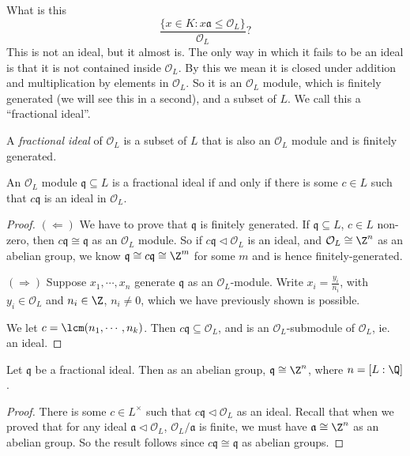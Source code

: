 \documentclass[a4paper]{article}
\begin{document}
What is this
\[
  \frac{\{x \in K: x \mathfrak{a} \leq \mathcal{O}_L\}}{\mathcal{O}_L}?
\]
This is not an ideal, but it almost is. The only way in which it fails to be an ideal is that it is not contained inside $\mathcal{O}_L$. By this we mean it is closed under addition and multiplication by elements in $\mathcal{O}_L$. So it is an $\mathcal{O}_L$ module, which is finitely generated (we will see this in a second), and a subset of $L$. We call this a ``fractional ideal''.

\begin{defi}
  A \emph{fractional ideal} of $\mathcal{O}_L$ is a subset of $L$ that is also an $\mathcal{O}_L$ module and is finitely generated.
\end{defi}

\begin{lemma}
  An $\mathcal{O}_L$ module $\mathfrak{q} \subseteq L$ is a fractional ideal if and only if there is some $c \in L$ such that $c\mathfrak{q}$ is an ideal in $\mathcal{O}_L$.
\end{lemma}

\begin{proof}
  $(\Leftarrow)$ We have to prove that $\mathfrak{q}$ is finitely generated. If $\mathfrak{q} \subseteq L$, $c \in L$ non-zero, then $c\mathfrak{q} \cong \mathfrak{q}$ as an $\mathcal{O}_L$ module. So if $c\mathfrak{q} \lhd \mathcal{O}_L$ is an ideal, and $\mathcal{O}_L \cong \Z^n$ as an abelian group, we know $\mathfrak{q} \cong c\mathfrak{q} \cong \Z^m$ for some $m$ and is hence finitely-generated.

  $(\Rightarrow)$ Suppose $x_1, \cdots, x_n$ generate $\mathfrak{q}$ as an $\mathcal{O}_L$-module. Write $x_i = \frac{y_i}{n_i}$, with $y_i \in \mathcal{O}_L$ and $n_i \in \Z$, $n_i \not= 0$, which we have previously shown is possible.

  We let $c = \lcm(n_1, \cdots, n_k)$. Then $c\mathfrak{q} \subseteq \mathcal{O}_L$, and is an $\mathcal{O}_L$-submodule of $\mathcal{O}_L$, ie. an ideal.
\end{proof}

\begin{cor}
  Let $\mathfrak{q}$ be a fractional ideal. Then as an abelian group, $\mathfrak{q} \cong \Z^n$, where $n = [L:\Q]$.
\end{cor}

\begin{proof}
  There is some $c \in L^\times$ such that $c\mathfrak{q} \lhd \mathcal{O}_L$ as an ideal. Recall that when we proved that for any ideal $\mathfrak{a} \lhd \mathcal{O}_L$, $\mathcal{O}_L/\mathfrak{a}$ is finite, we must have $\mathfrak{a} \cong \Z^n$ as an abelian group. So the result follows since $c\mathfrak{q}\cong \mathfrak{q}$ as abelian groups.
\end{proof}
\end{document}
